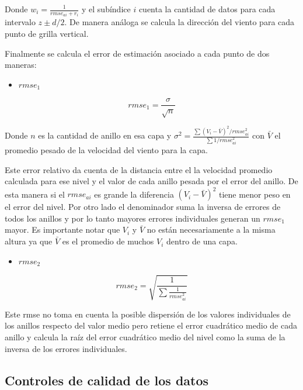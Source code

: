 \documentclass[12pt,spanish,oneside]{book}
\providecommand{\tightlist}{%
  \setlength{\itemsep}{0pt}\setlength{\parskip}{0pt}}
\begin{document}
Donde \(w_i = \frac {1}{rmse_{ai} + r_i}\) y el subíndice \(i\) cuenta
la cantidad de datos para cada intervalo \(z \pm d/2\). De manera
análoga se calcula la dirección del viento para cada punto de grilla
vertical.

Finalmente se calcula el error de estimación asociado a cada punto de
dos maneras:

\begin{itemize}
\tightlist
\item
  \textbf{\(rmse_1\)}
\end{itemize}

\begin{equation}\label{eq-vr10} 
rmse_1 = \frac{\sigma}{\sqrt{n}}
\end{equation}

Donde \(n\) es la cantidad de anillo en esa capa y
\(\sigma^{2}= \frac{\sum (V_i - \bar{V})^2 /rmse_{ai}^2}{\sum 1/rmse_{ai}^2}\)
con \(\bar{V}\) el promedio pesado de la velocidad del viento para la
capa.

Este error relativo da cuenta de la distancia entre el la velocidad
promedio calculada para ese nivel y el valor de cada anillo pesada por
el error del anillo. De esta manera si el \(rmse_{ai}\) es grande la
diferencia \((V_i - \bar{V})^2\) tiene menor peso en el error del nivel.
Por otro lado el denominador suma la inversa de errores de todos los
anillos y por lo tanto mayores errores individuales generan un
\(rmse_1\) mayor. Es importante notar que \(V_i\) y \(\bar{V}\) no están
necesariamente a la misma altura ya que \(\bar{V}\) es el promedio de
muchos \(V_i\) dentro de una capa.

\begin{itemize}
\tightlist
\item
  \textbf{\(rmse_2\)}
\end{itemize}

\begin{equation}\label{eq-vr11}
rmse_2 = \sqrt{\frac{1}{\sum \frac{1}{rmse_{ai}^2}}}
\end{equation}

Este rmse no toma en cuenta la posible dispersión de los valores
individuales de los anillos respecto del valor medio pero retiene el
error cuadrático medio de cada anillo y calcula la raíz del error
cuadrático medio del nivel como la suma de la inversa de los errores
individuales.

\subsection{Controles de calidad de los
datos}\label{controles-de-calidad-de-los-datos}
\end{document}
